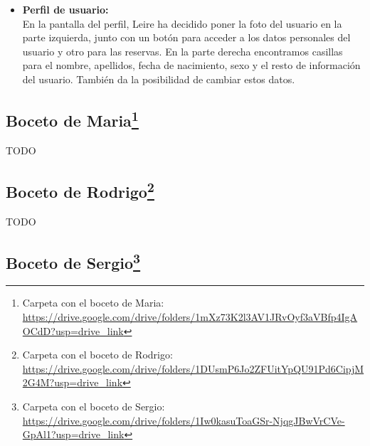 \begin{itemize}
    \item\textbf{Perfil de usuario:} \\ En la pantalla del perfil, Leire ha decidido poner la foto del usuario en la parte izquierda, junto con un botón para acceder a los datos personales del usuario y otro para las reservas.
    En la parte derecha encontramos casillas para el nombre, apellidos, fecha de nacimiento, sexo y el resto de información del usuario. También da la posibilidad de cambiar estos datos.
    
\end{itemize}
\subsection[Boceto de Maria]{Boceto de Maria\footnote{Carpeta con el boceto de Maria: \url{https://drive.google.com/drive/folders/1mXz73K2l3AV1JRvOyf3aVBfp4IgAOCdD?usp=drive_link}}}

TODO

\subsection[Boceto de Rodrigo]{Boceto de Rodrigo\footnote{Carpeta con el boceto de Rodrigo: \url{https://drive.google.com/drive/folders/1DUsmP6Jo2ZFUitYpQU91Pd6CipjM2G4M?usp=drive_link}}}

TODO

\subsection[Boceto de Sergio]{Boceto de Sergio\footnote{Carpeta con el boceto de Sergio: \url{https://drive.google.com/drive/folders/1Iw0kasuToaGSr-NjqgJBwVrCVe-GpAl1?usp=drive_link}}}

